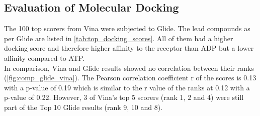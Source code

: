 \documentclass[11pt, letterpaper, titlepage]{article}
\begin{document}
\subsection{Evaluation of Molecular Docking}
The 100 top scorers from Vina were subjected to Glide. The lead compounds as per Glide are listed in \autoref{tab:top_docking_scores}. All of them had a higher docking score and therefore higher affinity to the receptor than ADP but a lower affinity compared to ATP.\\
In comparison, Vina and Glide results showed no correlation between their ranks (\autoref{fig:comp_glide_vina}). The Pearson correlation coefficient r of the scores is 0.13 with a p-value of 0.19 which is similar to the r value of the ranks at 0.12 with a p-value of 0.22. However, 3 of Vina's top 5 scorers (rank 1, 2 and 4) were still part of the Top 10 Glide results (rank 9, 10 and 8). 
\end{document}
